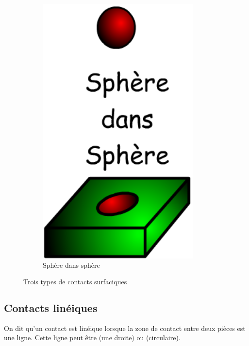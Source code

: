 \documentclass[10pt,fleqn]{article} %
\begin{document}
\begin{figure}[h]
\begin{subfigure}[b]{0.3\textwidth}
    \includegraphics[width=0.9\textwidth,height=.15\textheight,keepaspectratio]{images/surface_sphere}
    \caption{Sphère dans sphère}
  \end{subfigure}\hfill
  \caption{Trois types de contacts surfaciques}
  \label{fig:surfacique}
\end{figure}

\subsection{Contacts linéiques}
\begin{defi}
  On dit qu'un contact est linéique lorsque la zone de contact entre deux pièces est une ligne. Cette ligne peut être  (une droite) ou  (circulaire).
\end{defi}
\end{document}
